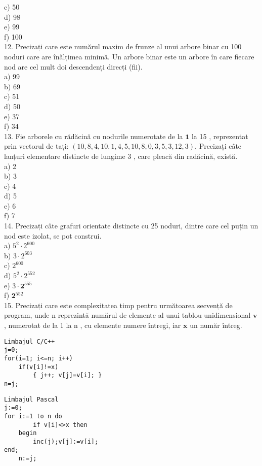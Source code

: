 c) 50\\
d) 98\\
e) 99\\
f) 100\\
12. Precizați care este numărul maxim de frunze al unui arbore binar cu 100 noduri care are înălțimea minimă. Un arbore binar este un arbore în care fiecare nod are cel mult doi descendenți direcți (fii).\\
a) 99\\
b) 69\\
c) 51\\
d) 50\\
e) 37\\
f) 34\\
13. Fie arborele cu rădăcină cu nodurile numerotate de la $\mathbf{1}$ la 15 , reprezentat prin vectorul de tați: $(10,8,4,10,1,4,5,10,8,0,3,5,3,12,3)$. Precizați câte lanțuri elementare distincte de lungime 3 , care pleacă din radăcină, există.\\
a) 2\\
b) 3\\
c) 4\\
d) 5\\
e) 6\\
f) 7\\
14. Precizați câte grafuri orientate distincte cu 25 noduri, dintre care cel puțin un nod este izolat, se pot construi.\\
a) $5^{2} \cdot 2^{600}$\\
b) $3 \cdot 2^{603}$\\
c) $2^{600}$\\
d) $5^{2} \cdot 2^{552}$\\
e) $3 \cdot \mathbf{2}^{555}$\\
f) $\mathbf{2}^{552}$\\
15. Precizați care este complexitatea timp pentru următoarea secvență de program, unde n reprezintă numărul de elemente al unui tablou unidimensional $\mathbf{v}$, numerotat de la 1 la n , cu elemente numere întregi, iar $\mathbf{x}$ un număr întreg.

\begin{verbatim}
Limbajul C/C++
j=0;
for(i=1; i<=n; i++)
    if(v[i]!=x)
        { j++; v[j]=v[i]; }
n=j;
\end{verbatim}

\begin{verbatim}
Limbajul Pascal
j:=0;
for i:=1 to n do
        if v[i]<>x then
    begin
        inc(j);v[j]:=v[i];
end;
    n:=j;
\end{verbatim}


